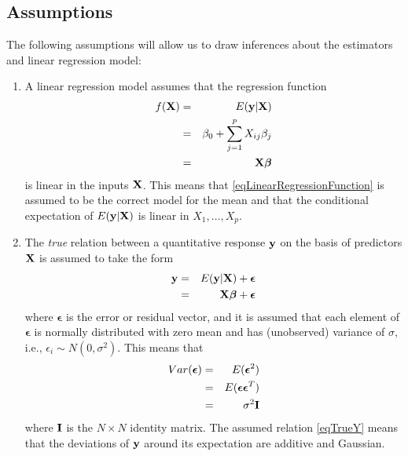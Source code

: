 \documentclass[11pt]{article}
\theoremstyle{remark}
\begin{document}
\subsection{Assumptions}
The following assumptions will allow us to draw inferences about the estimators and linear regression model:
\begin{enumerate}
\item A linear regression model assumes that the regression function
\begin{eqnarray}
f(\bold{X}) &=& E(\bold{y}|\bold{X})\nonumber\\
&=& \beta_0 + \sum_{j=1}^p X_{ij}\beta_j\nonumber\\
&=& \bold{X}\boldsymbol{\beta}\label{eqLinearRegressionFunction}
\end{eqnarray}
is linear in the inputs $\bold{X}$. This means that \eqref{eqLinearRegressionFunction} is assumed to be the correct model for the mean and that the conditional expectation of $E(\bold{y}|\bold{X})$ is linear in $X_1,\hdots,X_p$.
\item The \emph{true} relation between a quantitative response $\bold{y}$ on the basis of predictors $\bold{X}$ is assumed to take the form
\begin{eqnarray}
\bold{y} &=& E(\bold{y}|\bold{X}) + \boldsymbol{\epsilon}\nonumber\\
&=& \bold{X}\boldsymbol{\beta} + \boldsymbol{\epsilon}\label{eqTrueY}
\end{eqnarray}
where $\boldsymbol{\epsilon}$ is the error or residual vector, and it is assumed that each element of $\boldsymbol{\epsilon}$ is normally distributed with zero mean and has (unobserved) variance of $\sigma$, i.e., $\epsilon_i \sim N(0,\sigma^2)$. This means that
\begin{eqnarray} 
Var(\boldsymbol{\epsilon}) &=& E(\boldsymbol{\epsilon}^2)\nonumber\\
&=& E(\boldsymbol{\epsilon}\boldsymbol{\epsilon}^T)\nonumber\\
&=& \sigma^2\bold{I}\label{VarError}
\end{eqnarray}
where $\bold{I}$ is the $N \times N$ identity matrix. The assumed relation \eqref{eqTrueY} means that the deviations of $\bold{y}$ around its expectation are additive and Gaussian.
\end{enumerate}
\end{document}
